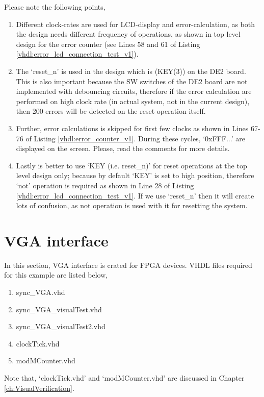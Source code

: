 \begin{noNumBox}
	Please note the following points, 
	
	\begin{enumerate}
		\item Different clock-rates are used for LCD-display and error-calculation, as both the design needs different frequency of operations, as shown in top level design for the error counter (see Lines 58 and 61 of Listing \ref{vhdl:error_lcd_connection_test_v1}). 
		\item The `reset\_n' is used in the design which is (KEY(3)) on the DE2 board. This is also important because the SW switches of the DE2 board are not implemented with debouncing circuits, therefore if the error calculation are performed on high clock rate (in actual system, not in the current design), then 200 errors will be detected on the reset operation itself. 
		\item Further, error calculations is skipped for first few clocks as shown in Lines 67-76 of Listing \ref{vhdl:error_counter_v1}. During these cycles, `0xFFF...' are displayed on the screen. Please, read  the comments for more details. 
		\item Lastly is better to use `KEY (i.e. reset\_n)' for reset operations at the top level design only; because by default `KEY' is set to high position, therefore `not' operation is required as shown in Line 28 of Listing \ref{vhdl:error_lcd_connection_test_v1}. If we use `reset\_n' then it will create lots of confusion, as not operation is used with it for resetting the system. 
	\end{enumerate}
\end{noNumBox}












\section{VGA interface}
In this section, VGA interface is crated for FPGA devices. VHDL files required for this example are listed below, 
\begin{enumerate}
	\item sync\_VGA.vhd
	\item sync\_VGA\_visualTest.vhd
	\item sync\_VGA\_visualTest2.vhd
	\item clockTick.vhd
	\item modMCounter.vhd
\end{enumerate}
Note that, `clockTick.vhd' and `modMCounter.vhd' are discussed in Chapter \ref{ch:VisualVerification}.



